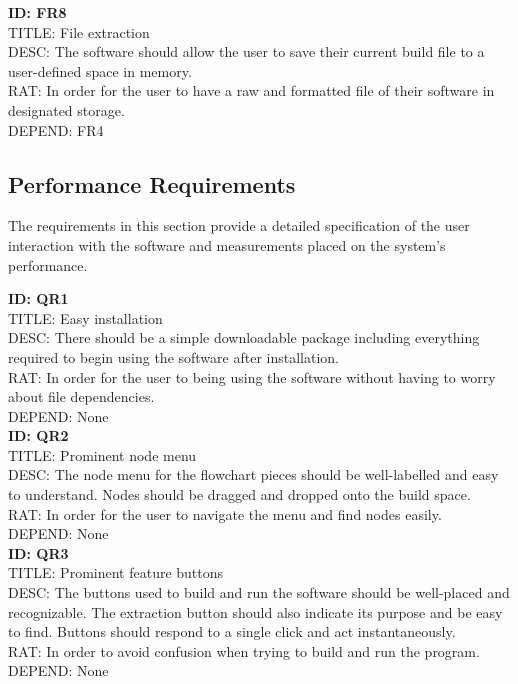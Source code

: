 \documentclass[a4paper,10pt]{article} \usepackage[margin=1.0in]{geometry} \usepackage{pdfpages} \usepackage{graphicx}
\begin{document}
\noindent
\textbf{ID: FR8}\\
TITLE: File extraction\\
DESC: The software should allow the user to save their current build file to a user-defined space in memory.\\
RAT: In order for the user to have a raw and formatted file of their software in designated storage.\\
DEPEND: FR4\\


\subsection{Performance Requirements}

The requirements in this section provide a detailed specification of the user interaction with the software and measurements placed on the system's performance.

\noindent
\textbf{ID: QR1}\\
TITLE: Easy installation\\
DESC: There should be a simple downloadable package including everything required to begin using the software after installation.\\
RAT: In order for the user to being using the software without having to worry about file dependencies.\\
DEPEND: None\\

\noindent
\textbf{ID: QR2}\\
TITLE: Prominent node menu\\
DESC: The node menu for the flowchart pieces should be well-labelled and easy to understand. Nodes should be dragged and dropped onto the build space.\\
RAT: In order for the user to navigate the menu and find nodes easily.\\
DEPEND: None\\

\noindent
\textbf{ID: QR3}\\
TITLE: Prominent feature buttons\\
DESC: The buttons used to build and run the software should be well-placed and recognizable. 
The extraction button should also indicate its purpose and be easy to find.
Buttons should respond to a single click and act instantaneously.\\
RAT: In order to avoid confusion when trying to build and run the program.\\
DEPEND: None\\
\end{document}
